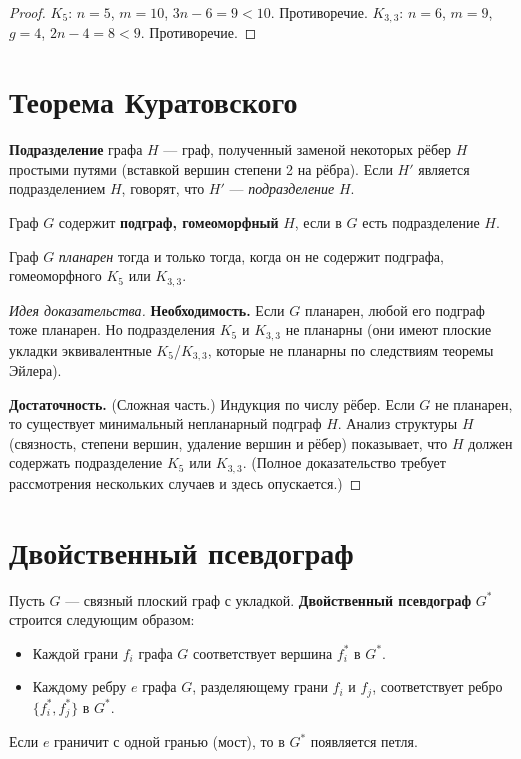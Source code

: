 \documentclass[12pt]{article}
\begin{document}
\begin{proof}
$K_5$: $n=5$, $m=10$, $3n-6=9 < 10$. Противоречие.
$K_{3,3}$: $n=6$, $m=9$, $g=4$, $2n-4=8 < 9$. Противоречие.
\end{proof}

\section{Теорема Куратовского}

\begin{definition}
\textbf{Подразделение} графа $H$ --- граф, полученный заменой
некоторых рёбер $H$ простыми путями (вставкой вершин степени 2
на рёбра). Если $H' $ является подразделением $H$, говорят,
что $H'$ --- \emph{подразделение} $H$.

Граф $G$ содержит \textbf{подграф, гомеоморфный} $H$,
если в $G$ есть подразделение $H$.
\end{definition}

\begin{theorem}[Куратовский, 1930]
Граф $G$ \emph{планарен} тогда и только тогда, когда он не содержит
подграфа, гомеоморфного $K_5$ или $K_{3,3}$.
\end{theorem}

\begin{proof}[Идея доказательства]
\textbf{Необходимость.} Если $G$ планарен, любой его подграф
тоже планарен. Но подразделения $K_5$ и $K_{3,3}$ не планарны
(они имеют плоские укладки эквивалентные $K_5$/$K_{3,3}$, которые
не планарны по следствиям теоремы Эйлера).

\textbf{Достаточность.} (Сложная часть.) Индукция по числу рёбер.
Если $G$ не планарен, то существует минимальный непланарный подграф $H$.
Анализ структуры $H$ (связность, степени вершин, удаление вершин
и рёбер) показывает, что $H$ должен содержать подразделение
$K_5$ или $K_{3,3}$.
(Полное доказательство требует рассмотрения нескольких случаев и
здесь опускается.)
\end{proof}

\section{Двойственный псевдограф}

\begin{definition}
Пусть $G$ --- связный плоский граф с укладкой. \textbf{Двойственный
псевдограф} $G^*$ строится следующим образом:
\begin{itemize}
\item Каждой грани $f_i$ графа $G$ соответствует вершина $f_i^*$ в $G^*$.
\item Каждому ребру $e$ графа $G$, разделяющему грани $f_i$ и $f_j$,
      соответствует ребро $\{f_i^*, f_j^*\}$ в $G^*$.
\end{itemize}
Если $e$ граничит с одной гранью (мост), то в $G^*$ появляется петля.
\end{definition}
\end{document}
